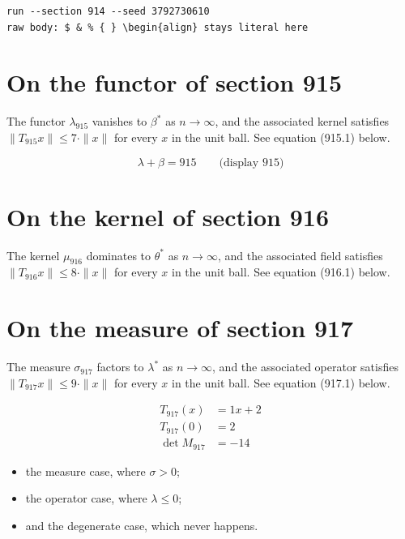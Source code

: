 \documentclass{article}
\begin{document}
\begin{verbatim}
run --section 914 --seed 3792730610
raw body: $ & % { } \begin{align} stays literal here
\end{verbatim}

\section{On the functor of section 915}
The functor $\lambda_{915}$ vanishes to $\beta^{*}$ as $n \to \infty$,
and the associated kernel satisfies $\|T_{915} x\| \leq 7 \cdot \|x\|$
for every $x$ in the unit ball. See equation (915.1) below.

$$
\lambda + \beta = 915 \qquad \text{(display 915)}
$$

\section{On the kernel of section 916}
The kernel $\mu_{916}$ dominates to $\theta^{*}$ as $n \to \infty$,
and the associated field satisfies $\|T_{916} x\| \leq 8 \cdot \|x\|$
for every $x$ in the unit ball. See equation (916.1) below.

\section{On the measure of section 917}
The measure $\sigma_{917}$ factors to $\lambda^{*}$ as $n \to \infty$,
and the associated operator satisfies $\|T_{917} x\| \leq 9 \cdot \|x\|$
for every $x$ in the unit ball. See equation (917.1) below.

\begin{align}
T_{917}(x) &= 1 x + 2 \\
T_{917}(0) &= 2 \\
\det M_{917} &= -14
\end{align}

\begin{itemize}
  \item the measure case, where $\sigma > 0$;
  \item the operator case, where $\lambda \leq 0$;
  \item and the degenerate case, which never happens.
\end{itemize}
\end{document}
